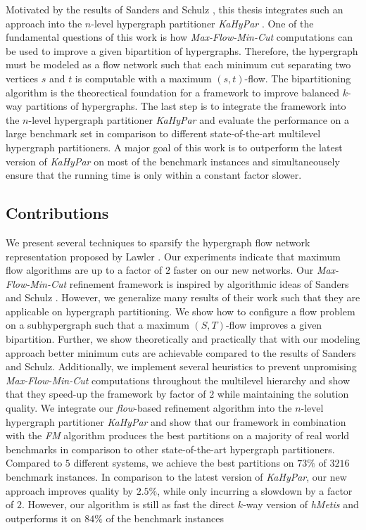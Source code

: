 Motivated by the results of Sanders and Schulz \cite{sanders2011engineering}, this thesis
integrates such an approach into the $n$-level hypergraph partitioner \emph{KaHyPar} \cite{heuer2017improving}.
One of the fundamental questions of this work is how \emph{Max-Flow-Min-Cut} computations
can be used to improve a given bipartition of hypergraphs. Therefore, the hypergraph
must be modeled as a flow network such that each minimum cut separating two vertices
$s$ and $t$ is computable with a maximum $(s,t)$-flow. The bipartitioning algorithm is 
the theorectical foundation for a framework to improve balanced $k$-way partitions of hypergraphs.
The last step is to integrate the framework into the
$n$-level hypergraph partitioner \emph{KaHyPar} \cite{heuer2017improving} and evaluate
the performance on a large benchmark set in comparison to different state-of-the-art 
multilevel hypergraph partitioners. A major goal of this work is to outperform the 
latest version of \emph{KaHyPar} on most of the benchmark instances and simultaneousely
ensure that the running time is only within a constant factor slower.

\subsection{Contributions}

We present several techniques to sparsify the hypergraph flow network
representation proposed by Lawler \cite{lawler1973}. Our experiments indicate that
maximum flow algorithms are up to a factor of $2$ faster on our new networks. 
Our \emph{Max-Flow-Min-Cut} refinement framework is inspired by algorithmic ideas of
Sanders and Schulz \cite{sanders2011engineering}. However, we generalize many results of
their work such that they are applicable on hypergraph partitioning. We show how to 
configure a flow problem on a subhypergraph such that a 
maximum $(S,T)$-flow improves a given bipartition. 
Further, we show theoretically and practically that with our modeling approach 
better minimum cuts are achievable compared to the results of Sanders and Schulz.
Additionally, we implement several heuristics to prevent unpromising \emph{Max-Flow-Min-Cut} computations 
throughout the multilevel hierarchy and show that they speed-up the framework by factor
of $2$ while maintaining the solution quality.
We integrate our \emph{flow}-based refinement algorithm into the $n$-level hypergraph partitioner
\emph{KaHyPar} and show that our framework in combination with the
\emph{FM} algorithm produces the best partitions on a majority of real world benchmarks
in comparison to other state-of-the-art hypergraph partitioners. 
Compared to $5$ different systems, we achieve the best partitions on $73\%$ 
of $3216$ benchmark instances. In comparison to the 
latest version of \emph{KaHyPar}, our new approach improves quality by
$2.5\%$, while only incurring a slowdown by a factor of $2$.
However, our algorithm is still as fast the direct $k$-way
version of \emph{hMetis} and outperforms it on $84\%$ of the benchmark instances

